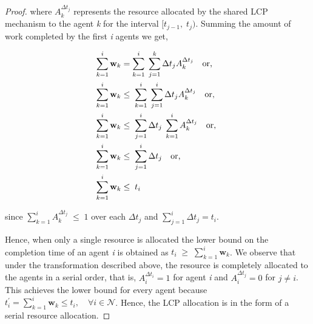 \documentclass[letterpaper]{article} %
\theoremstyle{definition}
\begin{document}
\begin{proof}
\noindent where $A^{\Delta t_{j}}_{k}$ represents the resource allocated by the shared LCP mechanism to the agent \textit{k} for the interval $[t_{j-1}, \; t_{j})$. Summing the amount of work completed by the first \textit{i} agents we get,\\
\begin{linenomath}
\begin{equation*}
\begin{split}
\displaystyle \sum^{i}_{k=1} \mathbf{w}_{k} & = \sum^{i}_{k=1} \; \sum^{k}_{j=1} \Delta t_{j} A^{\Delta t_{j}}_{k} \quad \textnormal{or,}\\
\displaystyle \sum^{i}_{k=1} \mathbf{w}_{k}  & \leq \; \sum^{i}_{k=1} \; \sum^{i}_{j=1} \Delta t_{j} A^{\Delta t_{j}}_{k} \quad \textnormal{or,}\\
\displaystyle \sum^{i}_{k=1} \mathbf{w}_{k} & \leq \;  \sum^{i}_{j=1} \Delta t_{j} \; \sum^{i}_{k=1} A^{\Delta t_{j}}_{k} \quad \textnormal{or, }\\
\displaystyle \sum^{i}_{k=1} \mathbf{w}_{k} & \leq \;  \sum^{i}_{j=1} \Delta t_{j} \quad \textnormal{or,}\\
\displaystyle \sum^{i}_{k=1} \mathbf{w}_{k} & \leq  \; t_{i}
\end{split}    
\end{equation*}
\end{linenomath}

\noindent since $\displaystyle \sum^{i}_{k=1} A^{\Delta t_{j}}_{k} \; \leq \; 1$ over each $\Delta t_{j}$ and $\displaystyle \sum^{i}_{j=1} \Delta t_{j} = t_{i} $. 

Hence, when only a single resource is allocated the lower bound on the completion time of an agent \textit{i} is obtained as $t_{i} \; \geq \; \sum^{i}_{k=1}\mathbf{w}_{k}$. We observe that under the transformation described above, the resource is completely allocated to the agents in a serial order, that is, $A^{\Delta t_{i}}_{i} = 1$ for agent \textit{i} and $A^{\Delta t_{j}}_{i} = 0$ for $j \neq i$. This achieves the lower bound for every agent because $t^{'}_{i} = \sum^{i}_{k=1}\mathbf{w}_{k} \leq t_{i}, \quad \forall i \in \mathcal{N}$. Hence, the LCP allocation is in the form of a serial resource allocation.  


\end{proof}
\end{document}
